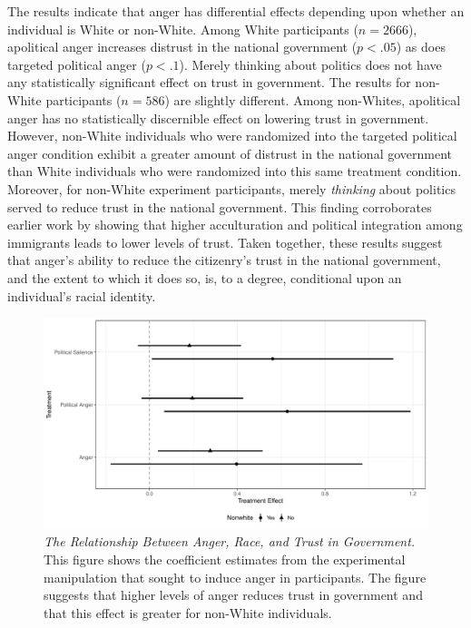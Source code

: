 \documentclass[12t, letterpaper]{article}
\begin{document}
The results indicate that anger has differential effects depending upon whether an individual is White or non-White. Among White participants ($n=2666$), apolitical anger increases distrust in the national government ($p < .05$) as does targeted political anger ($p < .1$). Merely thinking about politics does not have any statistically significant effect on trust in government. The results for non-White participants ($n=586$) are slightly different. Among non-Whites, apolitical anger has no statistically discernible effect on lowering trust in government. However, non-White individuals who were randomized into the targeted political anger condition exhibit a greater amount of distrust in the national government than White individuals who were randomized into this same treatment condition. Moreover, for non-White experiment participants, merely \emph{thinking} about politics served to reduce trust in the national government. This finding corroborates earlier work by \citet{abrajano2010} showing that higher acculturation and political integration among immigrants leads to lower levels of trust. Taken together, these results suggest that anger's ability to reduce the citizenry's trust in the national government, and the extent to which it does so, is, to a degree, conditional upon an individual's racial identity.

\begin{center}
\begin{figure}
\includegraphics[width=\textwidth]{coefs}
\caption{\footnotesize\textit{The Relationship Between Anger, Race, and Trust in Government.} This figure shows the coefficient estimates from the experimental manipulation that sought to induce anger in participants. The figure suggests that higher levels of anger reduces trust in government and that this effect is greater for non-White individuals.}
\label{fig:coef_plot}
\end{figure}
\end{center}


\newpage
\begin{singlespacing}


\end{singlespacing}
\end{document}
